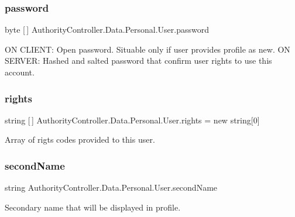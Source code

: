 \subsubsection{\texorpdfstring{password}{password}}
{\footnotesize\ttfamily byte \mbox{[}$\,$\mbox{]} Authority\+Controller.\+Data.\+Personal.\+User.\+password}



ON C\+L\+I\+E\+NT\+: Open password. Situable only if user provides profile as new. ON S\+E\+R\+V\+ER\+: Hashed and salted password that confirm user rights to use this account. 

\mbox{\label{class_authority_controller_1_1_data_1_1_personal_1_1_user_a937c23d9fddf843c49a69a6424bfda02}} 
\subsubsection{\texorpdfstring{rights}{rights}}
{\footnotesize\ttfamily string \mbox{[}$\,$\mbox{]} Authority\+Controller.\+Data.\+Personal.\+User.\+rights = new string\mbox{[}0\mbox{]}}



Array of rigts\textquotesingle{} codes provided to this user. 

\mbox{\label{class_authority_controller_1_1_data_1_1_personal_1_1_user_a8b4f88cdbace4ccf3101c6a62dc26a10}} 
\subsubsection{\texorpdfstring{second\+Name}{secondName}}
{\footnotesize\ttfamily string Authority\+Controller.\+Data.\+Personal.\+User.\+second\+Name}



Secondary name that will be displayed in profile. 

